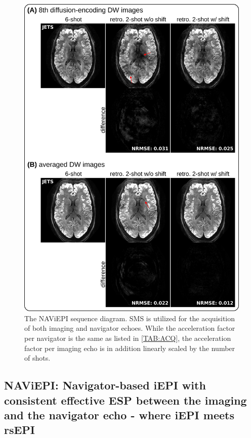 \documentclass[preprint,12pt,authoryear,review]{elsarticle}
\begin{document}
    \begin{figure}
        \centering
        \includegraphics[width=\linewidth]{../figures/fig2.png}
        \caption{The NAViEPI sequence diagram.
        SMS is utilized for the acquisition of both imaging and
        navigator echoes. While the acceleration factor per navigator is
        the same as listed in \cref{TAB:ACQ},
        the acceleration factor per imaging echo is
        in addition linearly scaled by the number of shots.}
        \label{FIG:seq}
    \end{figure}

    \subsection{NAViEPI: Navigator-based iEPI with consistent effective ESP
    between the imaging and the navigator echo - where iEPI meets rsEPI}
\end{document}
